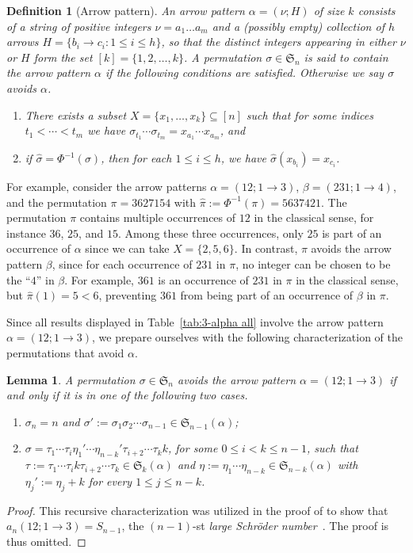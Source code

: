 \documentclass[12pt]{amsart}
\numberwithin{equation}{section}
\theoremstyle{plain}
\newtheorem{lemma}[theorem]{Lemma}
\newtheorem{definition}[theorem]{Definition}
\def\fS{\mathfrak{S}}
\begin{document}
	\begin{definition}[Arrow pattern]
	An \emph{arrow pattern} $\alpha=(\nu;H)$ of size $k$ consists of a string of positive integers $\nu=a_1\ldots a_m$ and a (possibly empty) collection of $h$ arrows $H=\{b_i\to c_i : 1\le i\le h\}$, so that the distinct integers appearing in either $\nu$ or $H$ form the set $[k]=\{1,2,\ldots,k\}$. A permutation $\sigma\in\fS_n$ is said to contain the arrow pattern $\alpha$ if the following conditions are satisfied. Otherwise we say $\sigma$ avoids $\alpha$.
	\begin{enumerate}
		\item There exists a subset $X=\{x_1,\ldots,x_k\}\subseteq [n]$ such that for some indices $t_1<\cdots <t_m$ we have $\sigma_{t_1}\cdots\sigma_{t_m}=x_{a_1}\cdots x_{a_m}$, and
		\item if $\hat{\sigma}=\Phi^{-1}(\sigma)$, then for each $1\le i\le h$, we have $\hat{\sigma}(x_{b_i})=x_{c_i}$.
	\end{enumerate}
	\end{definition}

	For example, consider the arrow patterns $\alpha=(12;1\to 3)$, $\beta=(231;1\to 4)$, and the permutation $\pi=3627154$ with $\hat{\pi}:=\Phi^{-1}(\pi)=5637421$. The permutation $\pi$ contains multiple occurrences of $12$ in the classical sense, for instance $36$, $25$, and $15$. Among these three occurrences, only $25$ is part of an occurrence of $\alpha$ since we can take $X=\{2,5,6\}$. In contrast, $\pi$ avoids the arrow pattern $\beta$, since for each occurrence of $231$ in $\pi$, no integer can be chosen to be the ``$4$'' in $\beta$. For example, $361$ is an occurrence of $231$ in $\pi$ in the classical sense, but $\hat{\pi}(1)=5<6$, preventing $361$ from being part of an occurrence of $\beta$ in $\pi$.

	Since all results displayed in Table~\ref{tab:3-alpha all} involve the arrow pattern $\alpha=(12;1\to 3)$, we prepare ourselves with the following characterization of the permutations that avoid $\alpha$. 

	\begin{lemma}\label{lem:char of alpha}
	A permutation $\sigma\in\fS_n$ avoids the arrow pattern $\alpha=(12;1\to 3)$ if and only if it is in one of the following two cases.
	\begin{enumerate}
		\item $\sigma_n=n$ and $\sigma':=\sigma_1\sigma_2\cdots\sigma_{n-1}\in\fS_{n-1}(\alpha)$;
		\item $\sigma=\tau_1\cdots\tau_i \eta_1'\cdots\eta_{n-k}'\tau_{i+2}\cdots\tau_{k}k$, for some $0\le i < k\le n-1$, such that $\tau:=\tau_1\cdots\tau_i k\tau_{i+2}\cdots\tau_k\in\fS_{k}(\alpha)$ and $\eta:=\eta_1\cdots\eta_{n-k}\in\fS_{n-k}(\alpha)$ with $\eta_j':=\eta_j+k$ for every $1\le j\le n-k$.
	\end{enumerate}
	\end{lemma}
	\begin{proof}
	This recursive characterization was utilized in the proof of \cite[Theorem 3.5]{AL2026} to show that $a_n(12;1\to 3)=S_{n-1}$, the $(n-1)$-st \emph{large Schr\"oder number}~\cite[A006318]{OEIS}. The proof is thus omitted.
	\end{proof}
\end{document}
